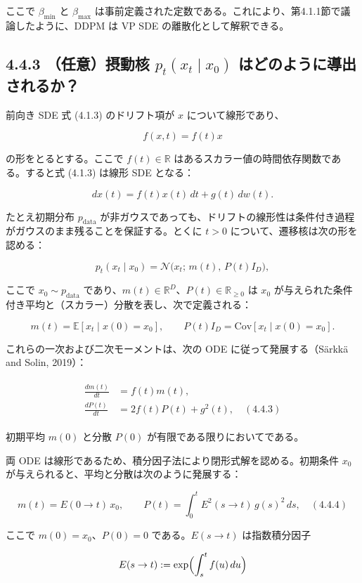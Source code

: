 ここで $\beta_{\min}$ と $\beta_{\max}$ は事前定義された定数である。これにより、第4.1.1節で議論したように、DDPM は VP SDE の離散化として解釈できる。

\subsection*{4.4.3 （任意）摂動核 $p_t(x_t\mid x_0)$ はどのように導出されるか？}


前向き SDE 式 (4.1.3) のドリフト項が $x$ について線形であり、

\[
f(x,t)=f(t)x
\]


の形をとるとする。ここで $f(t)\in\mathbb{R}$ はあるスカラー値の時間依存関数である。すると式 (4.1.3) は線形 SDE となる：

\[
dx(t)=f(t)x(t)\, dt + g(t)\, dw(t).
\]


たとえ初期分布 $p_{\mathrm{data}}$ が非ガウスであっても、ドリフトの線形性は条件付き過程がガウスのまま残ることを保証する。とくに $t>0$ について、遷移核は次の形を認める：

\[
p_t(x_t\mid x_0)=\mathcal{N}\bigl(x_t;\, m(t),\, P(t)I_D\bigr),
\]


ここで $x_0\sim p_{\mathrm{data}}$ であり、$m(t)\in\mathbb{R}^D$、$P(t)\in\mathbb{R}_{\ge 0}$ は $x_0$ が与えられた条件付き平均と（スカラー）分散を表し、次で定義される：

\[
m(t)=\mathbb{E}[x_t\mid x(0)=x_0], \qquad
P(t)I_D=\mathrm{Cov}[x_t\mid x(0)=x_0].
\]


これらの一次および二次モーメントは、次の ODE に従って発展する（Särkkä and Solin, 2019）：

\begin{align*}
\begin{aligned}
\frac{dm(t)}{dt} &= f(t)m(t), \\
\frac{dP(t)}{dt} &= 2f(t)P(t)+g^2(t), \quad (4.4.3)
\end{aligned}
\end{align*}


初期平均 $m(0)$ と分散 $P(0)$ が有限である限りにおいてである。

両 ODE は線形であるため、積分因子法により閉形式解を認める。初期条件 $x_0$ が与えられると、平均と分散は次のように発展する：

\[
m(t)=E(0\to t)\, x_0, \qquad
P(t)=\int_0^t E^2(s\to t)\, g(s)^2\, ds, \quad (4.4.4)
\]


ここで $m(0)=x_0$、$P(0)=0$ である。$E(s\to t)$ は指数積分因子

\[
E(s\to t):=\exp\Bigl(\int_s^t f(u)\, du\Bigr)
\]


